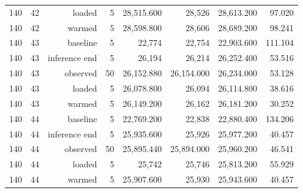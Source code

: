 \documentclass[10pt,a4paper]{article}
\begin{document}
\begin{longtable}{@{}lrrrrrrr@{}}
140 & 42 & loaded & 5 & 28,515.600 & 28,526 & 28,613.200 & 97.020 \\
140 & 42 & warmed & 5 & 28,598.800 & 28,606 & 28,689.200 & 98.241 \\
140 & 43 & baseline & 5 & 22,774 & 22,754 & 22,903.600 & 111.104 \\
140 & 43 & inference end & 5 & 26,194 & 26,214 & 26,252.400 & 53.516 \\
140 & 43 & observed & 50 & 26,152.880 & 26,154.000 & 26,234.000 & 53.128 \\
140 & 43 & loaded & 5 & 26,078.800 & 26,094 & 26,114.800 & 38.616 \\
140 & 43 & warmed & 5 & 26,149.200 & 26,162 & 26,181.200 & 30.252 \\
140 & 44 & baseline & 5 & 22,769.200 & 22,838 & 22,880.400 & 134.206 \\
140 & 44 & inference end & 5 & 25,935.600 & 25,926 & 25,977.200 & 40.457 \\
140 & 44 & observed & 50 & 25,895.440 & 25,894.000 & 25,960.200 & 46.541 \\
140 & 44 & loaded & 5 & 25,742 & 25,746 & 25,813.200 & 55.929 \\
140 & 44 & warmed & 5 & 25,907.600 & 25,930 & 25,943.600 & 40.457 \\
\end{longtable}\endgroup
\begingroup\small\setlength{\tabcolsep}{4pt}\renewcommand{\arraystretch}{1.12}
\end{document}
